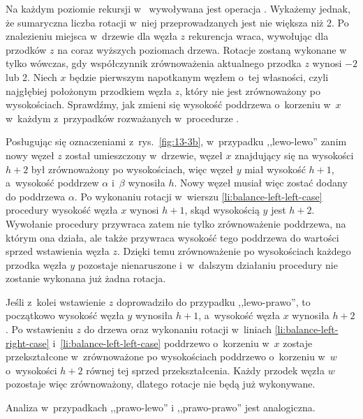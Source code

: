 Na każdym poziomie rekursji w~ wywoływana jest operacja .
Wykażemy jednak, że sumaryczna liczba rotacji w~niej przeprowadzanych jest nie większa niż 2.
Po znalezieniu miejsca w~drzewie dla węzła $z$ rekurencja wraca, wywołując  dla przodków $z$ na coraz wyższych poziomach drzewa.
Rotacje zostaną wykonane w~ tylko wówczas, gdy współczynnik zrównoważenia aktualnego przodka $z$ wynosi $-2$ lub 2.
Niech $x$ będzie pierwszym napotkanym węzłem o~tej własności, czyli najgłębiej położonym przodkiem węzła $z$, który nie jest zrównoważony po wysokościach.
Sprawdźmy, jak zmieni się wysokość poddrzewa o~korzeniu w~$x$ w~każdym z~przypadków rozważanych w~procedurze .

Posługując się oznaczeniami z~rys.\ \ref{fig:13-3b}, w~przypadku ,,lewo-lewo'' zanim nowy węzeł $z$ został umieszczony w~drzewie, węzeł $x$ znajdujący się na wysokości $h+2$ był zrównoważony po wysokościach, więc węzeł $y$ miał wysokość $h+1$, a~wysokość poddrzew $\alpha$ i~$\beta$ wynosiła $h$.
Nowy węzeł musiał więc zostać dodany do poddrzewa $\alpha$.
Po wykonaniu rotacji w~wierszu \ref{li:balance-left-left-case} procedury  wysokość węzła $x$ wynosi $h+1$, skąd wysokością $y$ jest $h+2$.
Wywołanie procedury  przywraca zatem nie tylko zrównoważenie poddrzewa, na którym ona działa, ale także przywraca wysokość tego poddrzewa do wartości sprzed wstawienia węzła $z$.
Dzięki temu zrównoważenie po wysokościach każdego przodka węzła $y$ pozostaje nienaruszone i~w~dalszym działaniu procedury  nie zostanie wykonana już żadna rotacja.

Jeśli z~kolei wstawienie $z$ doprowadziło do przypadku ,,lewo-prawo'', to początkowo wysokość węzła $y$ wynosiła $h+1$, a~wysokość węzła $x$ wynosiła $h+2$.
Po wstawieniu $z$ do drzewa oraz wykonaniu rotacji w~liniach \ref{li:balance-left-right-case} i~\ref{li:balance-left-left-case} poddrzewo o~korzeniu w~$x$ zostaje przekształcone w~zrównoważone po wysokościach poddrzewo o~korzeniu w~$w$ o~wysokości $h+2$ równej tej sprzed przekształcenia.
Każdy przodek węzła $w$ pozostaje więc zrównoważony, dlatego rotacje nie będą już wykonywane.

Analiza w~przypadkach ,,prawo-lewo'' i ,,prawo-prawo'' jest analogiczna.
